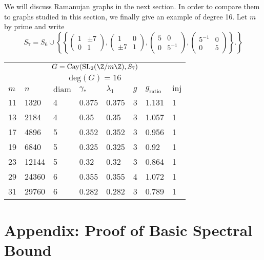 We will discuss Ramanujan graphs in the next section. In order to compare them to graphs studied in this section, we finally give an example of degree 16. Let $m$ by prime and write $$S_7 = S_6 \cup \left\{  \left\{ \begin{pmatrix}
1 & \pm 7 \\ 0 & 1
\end{pmatrix}, \begin{pmatrix}
1 & 0 \\ \pm 7 & 1
\end{pmatrix}, \begin{pmatrix}
5 & 0 \\ 0 & 5^{-1}
\end{pmatrix}, \begin{pmatrix}
5^{-1} & 0 \\  0 & 5 
\end{pmatrix} \right\}.  \right\}$$

\begin{center}
	\begin{tabular}{ p{1cm}|p{1cm}|p{1cm}|p{1cm}|p{1cm}|p{1cm}|p{1cm}|p{1cm} }
		\multicolumn{8}{c}{$G = \mathrm{Cay}(\mathrm{SL}_2(\Z/m\Z),S_7)$} \\
		\multicolumn{8}{c}{$\mathrm{deg}(G) = 16$} \\
		\hline
		$m$ & $n$ &  $\mathrm{diam}$ & $\gamma_*$ &  $\lambda_1$ & $g$ & $g_{\mathrm{ratio}}$ & $\mathrm{inj}$     \\
		\hline
		11 & 1320 & 4 &  0.375 & 0.375 & 3 & 1.131 & 1 \\
		13 & 2184 & 4 &  0.35 & 0.35 & 3 & 1.057 & 1 \\
		17 & 4896 & 5 &  0.352 & 0.352 & 3 & 0.956 & 1 \\
		19 & 6840 & 5 &  0.325 & 0.325 & 3 & 0.92 & 1 \\
		23 & 12144 & 5 &  0.32 & 0.32 & 3 & 0.864 & 1 \\
		29 & 24360 & 6 &  0.355 & 0.355 & 4 & 1.072 & 1 \\
		31 & 29760 & 6 &  0.282 & 0.282 & 3 & 0.789 & 1 \\
	\end{tabular}
\end{center}



\newpage

\section{Appendix: Proof of Basic Spectral Bound}

